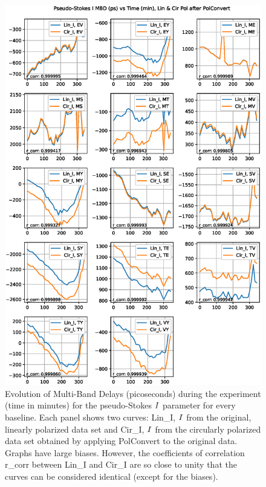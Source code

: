\documentclass[letterpaper,twoside,12pt]{article}
\begin{document}
\begin{figure}[ht!]
  \begin{center}
  \includegraphics[width=33pc]{MBD_Lin_I_and_Cir_I.eps}
  \caption{\small Evolution of Multi-Band Delays (picoseconds) during the experiment (time in minutes) for the pseudo-Stokes $\protect I$ parameter for every baseline. Each panel shows two curves: Lin\_I, $\protect I$ from the original, linearly polarized data set and Cir\_I, $\protect I$ from the circularly polarized data set obtained by applying PolConvert to the original data. Graphs have large biases. However, the coefficients of correlation r\_corr between Lin\_I and Cir\_I are so close to unity that the curves can be considered identical (except for the biases).}
  \label{mbd_lin_and_cir}
  \end{center}
\end{figure}
\end{document}
